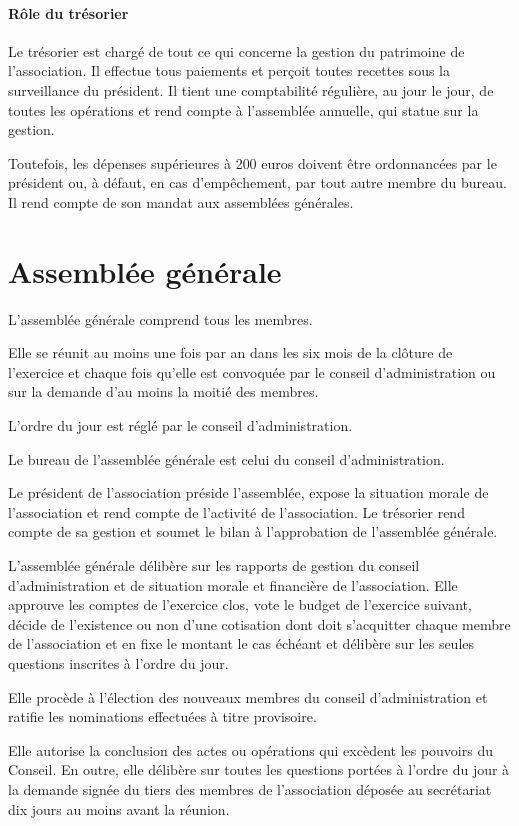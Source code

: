 \documentclass{article}
\begin{document}
\paragraph{Rôle du trésorier}

Le trésorier est chargé de tout ce qui concerne la gestion du
patrimoine de l'association. Il effectue tous paiements et perçoit
toutes recettes sous la surveillance du président.  Il tient une
comptabilité régulière, au jour le jour, de toutes les opérations et
rend compte à l'assemblée annuelle, qui statue sur la
gestion.

Toutefois, les dépenses supérieures à 200 euros doivent être
ordonnancées par le président ou, à défaut, en cas d'empêchement, par
tout autre membre du bureau. Il rend compte de son mandat aux
assemblées générales.

\section{Assemblée générale}
\label{sec:assemblee-generale}

L'assemblée générale comprend tous les membres.

Elle se réunit au moins une fois par an dans les six mois de la
clôture de l'exercice et chaque fois qu'elle est convoquée par le
conseil d'administration ou sur la demande d'au moins la moitié des
membres.

L'ordre du jour est réglé par le conseil d'administration.

Le bureau de l'assemblée générale est celui du conseil d'administration.

Le président de l'association préside l'assemblée, expose la situation
morale de l'association et rend compte de l'activité de
l'association. Le trésorier rend compte de sa gestion et soumet le
bilan à l'approbation de l'assemblée générale.

L'assemblée générale délibère sur les rapports de gestion du conseil
d'administration et de situation morale et financière de
l'association. Elle approuve les comptes de l'exercice clos, vote le
budget de l'exercice suivant, décide de l'existence ou non d'une
cotisation dont doit s'acquitter chaque membre de l'association et en
fixe le montant le cas échéant et délibère sur les seules questions
inscrites à l'ordre du jour.

Elle procède à l'élection des nouveaux membres du conseil
d'administration et ratifie les nominations effectuées à titre
provisoire.

Elle autorise la conclusion des actes ou opérations qui excèdent les
pouvoirs du Conseil. En outre, elle délibère sur toutes les questions
portées à l'ordre du jour à la demande signée du tiers des membres de
l'association déposée au secrétariat dix jours au moins avant la
réunion.
\end{document}
